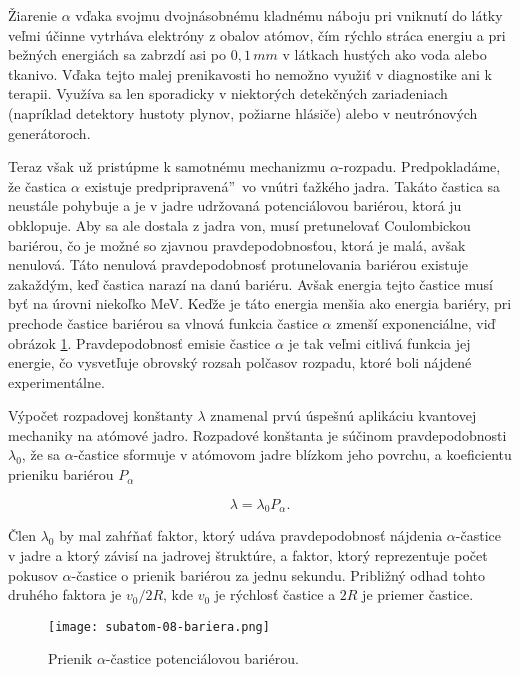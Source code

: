 \documentclass[../../main.tex]{subfiles}
\begin{document}
Žiarenie $\alpha$ vďaka svojmu dvojnásobnému kladnému náboju pri vniknutí do látky veľmi účinne vytrháva elektróny z obalov atómov, čím rýchlo stráca energiu a pri bežných energiách sa zabrzdí asi po $0,1\,\unit{mm}$ v látkach hustých ako voda alebo tkanivo. Vďaka tejto malej prenikavosti ho nemožno využiť v diagnostike ani k terapii. Využíva sa len sporadicky v niektorých detekčných zariadeniach (napríklad detektory hustoty plynov, požiarne hlásiče) alebo v neutrónových generátoroch.

Teraz však už pristúpme k samotnému mechanizmu $\alpha$-rozpadu. Predpokladáme, že častica $\alpha$ existuje \quotedblbase predpripravená\textquotedblright ~vo vnútri ťažkého jadra. Takáto častica sa neustále pohybuje a je v jadre udržovaná potenciálovou bariérou, ktorá ju obklopuje. Aby sa ale dostala z jadra von, musí pretunelovať Coulombickou bariérou, čo je možné so zjavnou pravdepodobnosťou, ktorá je malá, avšak nenulová. Táto nenulová pravdepodobnosť protunelovania bariérou existuje zakaždým, keď častica narazí na danú bariéru. Avšak energia tejto častice musí byť na úrovni niekoľko MeV. Keďže je táto energia menšia ako energia bariéry, pri prechode častice bariérou sa vlnová funkcia častice $\alpha$ zmenší exponenciálne, viď obrázok \ref{sf8:fig:beriera}. Pravdepodobnosť emisie častice $\alpha$ je tak veľmi citlivá funkcia jej energie, čo vysvetľuje obrovský rozsah polčasov rozpadu, ktoré boli nájdené experimentálne.

Výpočet rozpadovej konštanty $\lambda$ znamenal prvú úspešnú aplikáciu kvantovej mechaniky na atómové jadro. Rozpadové konštanta je súčinom pravdepodobnosti $\lambda_0$, že sa $\alpha$-častice sformuje v atómovom jadre blízkom jeho povrchu, a koeficientu prieniku bariérou $P_{\alpha}$

$$ \lambda = \lambda_0 P_{\alpha}. $$

Člen $\lambda_0$ by mal zahŕňať faktor, ktorý udáva pravdepodobnosť nájdenia $\alpha$-častice v jadre a ktorý závisí na jadrovej štruktúre, a faktor, ktorý reprezentuje počet pokusov $\alpha$-častice o prienik bariérou za jednu sekundu. Približný odhad tohto druhého faktora je $v_0/2R$, kde $v_0$ je rýchlosť častice a $2R$ je priemer častice.

\begin{figure}[!h]
\texttt{[image: subatom-08-bariera.png]}
\centering
\caption{Prienik $\alpha$-častice potenciálovou bariérou.}
\label{sf8:fig:beriera}
\end{figure}
\end{document}
